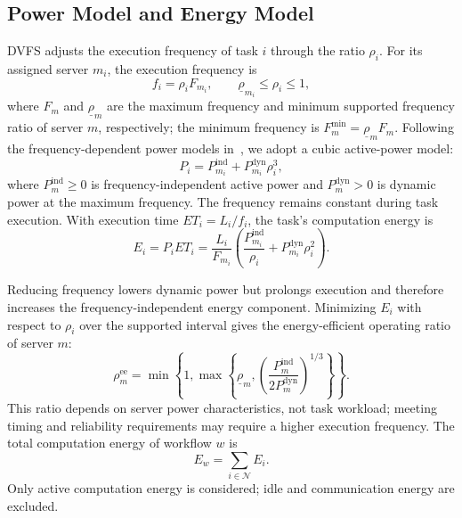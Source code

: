 \documentclass[lettersize,journal]{IEEEtran}
\begin{document}
\subsection{Power Model and Energy Model}
\label{subsec:energy_model}

DVFS adjusts the execution frequency of task $i$ through the ratio
$\rho_i$. For its assigned server $m_i$, the execution frequency is
\begin{equation}
 f_i=\rho_iF_{m_i},\qquad \underline\rho_{m_i}\leq\rho_i\leq1,
 \label{eq:task_frequency}
\end{equation}
where $F_m$ and $\underline\rho_m$ are the maximum frequency and minimum
supported frequency ratio of server $m$, respectively; the minimum
frequency is $F_m^{\min}=\underline\rho_m F_m$.
Following the frequency-dependent power models
in~\cite{xie2017energy,zhu2006energy}, we adopt a cubic active-power model:
\begin{equation}
 P_i=P_{m_i}^{\mathrm{ind}}+P_{m_i}^{\mathrm{dyn}}\rho_i^3,
 \label{eq:task_power}
\end{equation}
where $P_m^{\mathrm{ind}}\geq0$ is frequency-independent active power and
$P_m^{\mathrm{dyn}}>0$ is dynamic power at the maximum frequency.
The frequency remains constant during task execution. With execution
time $ET_i=L_i/f_i$, the task's computation energy is
\begin{equation}
 E_i=P_iET_i
 =\frac{L_i}{F_{m_i}}\left(
 \frac{P_{m_i}^{\mathrm{ind}}}{\rho_i}
 +P_{m_i}^{\mathrm{dyn}}\rho_i^2\right).
 \label{eq:task_energy}
\end{equation}

Reducing frequency lowers dynamic power but prolongs execution and
therefore increases the frequency-independent energy component.
Minimizing $E_i$ with respect to $\rho_i$ over the supported interval gives
the energy-efficient operating ratio of server $m$:
\begin{equation}
 \rho_m^{\mathrm{ee}}=\min\!\left\{1,\max\!\left\{
 \underline\rho_m,
 \left(\frac{P_m^{\mathrm{ind}}}{2P_m^{\mathrm{dyn}}}\right)^{1/3}
 \right\}\right\}.
 \label{eq:rhoee}
\end{equation}
This ratio depends on server power characteristics, not task workload;
meeting timing and reliability requirements may require a higher
execution frequency.
The total computation energy of workflow $w$ is
\begin{equation}
 E_w=\sum_{i\in\mathcal N}E_i.
 \label{eq:workflow_energy}
\end{equation}
Only active computation energy is considered; idle and communication
energy are excluded.
\end{document}
